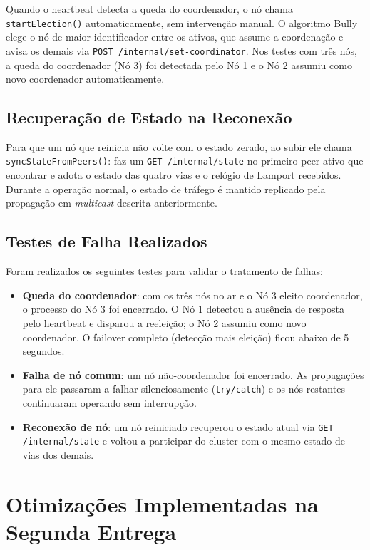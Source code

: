 \documentclass[12pt]{article}
\begin{document}
Quando o heartbeat detecta a queda do coordenador, o nó chama \texttt{startElection()} automaticamente, sem intervenção manual. O algoritmo Bully elege o nó de maior identificador entre os ativos, que assume a coordenação e avisa os demais via \texttt{POST /internal/set-coordinator}. Nos testes com três nós, a queda do coordenador (Nó 3) foi detectada pelo Nó 1 e o Nó 2 assumiu como novo coordenador automaticamente.

\subsection{Recuperação de Estado na Reconexão}

Para que um nó que reinicia não volte com o estado zerado, ao subir ele chama \texttt{syncStateFromPeers()}: faz um \texttt{GET /internal/state} no primeiro peer ativo que encontrar e adota o estado das quatro vias e o relógio de Lamport recebidos. Durante a operação normal, o estado de tráfego é mantido replicado pela propagação em \textit{multicast} descrita anteriormente.

\subsection{Testes de Falha Realizados}

Foram realizados os seguintes testes para validar o tratamento de falhas:
\begin{itemize}
    \item \textbf{Queda do coordenador}: com os três nós no ar e o Nó 3 eleito coordenador, o processo do Nó 3 foi encerrado. O Nó 1 detectou a ausência de resposta pelo heartbeat e disparou a reeleição; o Nó 2 assumiu como novo coordenador. O failover completo (detecção mais eleição) ficou abaixo de 5 segundos.
    \item \textbf{Falha de nó comum}: um nó não-coordenador foi encerrado. As propagações para ele passaram a falhar silenciosamente (\texttt{try/catch}) e os nós restantes continuaram operando sem interrupção.
    \item \textbf{Reconexão de nó}: um nó reiniciado recuperou o estado atual via \texttt{GET /internal/state} e voltou a participar do cluster com o mesmo estado de vias dos demais.
\end{itemize}

\section{Otimizações Implementadas na Segunda Entrega}
\end{document}
